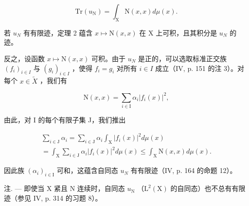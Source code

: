 \[
\mathrm{Tr} (u _ {\mathrm{N}}) = \int_ {\mathrm{X}} \mathrm{N} (x, x) d \mu (x).
\]

若 \(u_{N}\) 有有限迹，定理 2 蕴含 \(x \mapsto \mathrm{N}(x, x)\) 在 X 上可积，且其积分是 \(u_{N}\) 的迹。

反之，设函数 \(x \mapsto \mathrm{N}(x, x)\) 可积。由于 \(u_{N}\) 是正的，可以选取标准正交族 \((f_i)_{i \in I}\) 与 \((g_i)_{i \in I}\) ，使得 \(f_i = g_i\) 对所有 \(i \in I\) 成立（IV, p. 151 的注 3）。对每个 \(x \in \widetilde{X}\) ，我们有

\[
\mathrm{N} (x, x) = \sum_ {i \in \mathrm{I}} \alpha_ {i} | f _ {i} (x) | ^ {2},
\]

由此，对 I 的每个有限子集 J，我们推出

\[
\begin{array}{c} \sum_ {i \in \mathrm{J}} \alpha_ {i} = \sum_ {i \in \mathrm{J}} \alpha_ {i} \int_ {\mathrm{X}} | f _ {i} (x) | ^ {2} d \mu (x) \\ = \int_ {\mathrm{X}} \sum_ {i \in \mathrm{J}} \alpha_ {i} | f _ {i} (x) | ^ {2} d \mu (x) \leqslant \int_ {\mathrm{X}} \mathrm{N} (x, x) d \mu (x). \end{array}
\]

因此族 \((\alpha_{i})_{i\in\mathrm{I}}\) 可和，这蕴含自同态 \(u_{N}\) 有有限迹（IV, p. 164 的命题 12）。

注. --- 即使当 X 紧且 N 连续时，自同态 \(u_{\mathrm{N}}\) （\(\mathrm{L}^{2}(\mathrm{X})\) 的自同态）也不总有有限迹（参见 IV, p. 314 的习题 8）。

